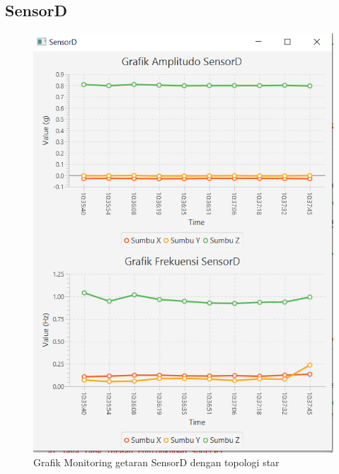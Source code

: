 \subsection{SensorD}
\begin{figure}[H] 
	\centering  
	\includegraphics[scale=1]{Lampiran/HasilPengujian/sensorD_starRooftop2.PNG} 
	\caption[Grafik Monitoring getaran SensorD dengan topologi star]{Grafik Monitoring getaran SensorD dengan topologi star}
	\label{fig:grafik_D_star_rooftop} 
\end{figure}

